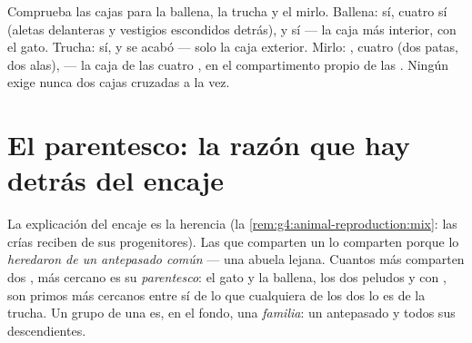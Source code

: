 \begin{example}\label{ex:g6:classification-kinship:placing}
Comprueba las cajas para la ballena, la trucha y el mirlo. Ballena:
 sí, cuatro  sí (aletas delanteras y
vestigios escondidos detrás),  y  sí --- la caja más interior,
con el gato. Trucha:  sí, y se acabó --- solo la caja
exterior. Mirlo: , cuatro  (dos patas, dos
alas),  --- la caja de las cuatro , en el
compartimento propio de las . Ningún  exige nunca dos cajas
cruzadas a la vez.
\end{example}

\section{El parentesco: la razón que hay detrás del encaje}

\begin{proposition}\label{prop:g6:classification-kinship:kinship}
La explicación del encaje es la herencia (la
\cref{rem:g4:animal-reproduction:mix}: las crías reciben de sus
progenitores). Las  que comparten un  lo comparten
porque lo \emph{heredaron de un antepasado común} --- una 
abuela lejana. Cuantos más  comparten dos , más
cercano es su \emph{parentesco}: el gato y la
ballena, los dos peludos y con , son primos más cercanos entre sí
de lo que cualquiera de los dos lo es de la trucha. Un grupo de una
 es, en el fondo, una \emph{familia}: un antepasado y todos
sus descendientes.
\end{proposition}
\admitted

